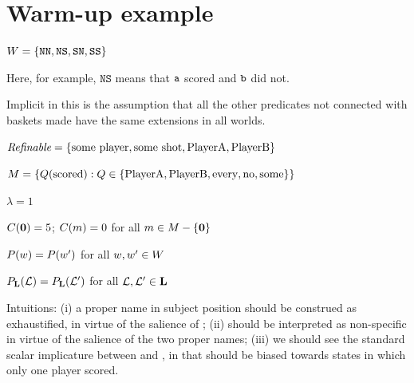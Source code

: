 \documentclass{article}
\begin{document}
\newpage

\section{Warm-up example}

\newcommand{\sNN}{\texttt{NN}}
\newcommand{\sNS}{\texttt{NS}}
\newcommand{\sNA}{\texttt{NA}}

\newcommand{\sSN}{\texttt{SN}}
\newcommand{\sSS}{\texttt{SS}}
\newcommand{\sSA}{\texttt{SA}}

\newcommand{\sAN}{\texttt{AN}}
\newcommand{\sAS}{\texttt{AS}}
\newcommand{\sAA}{\texttt{AA}}

\begin{examples}
\item

 \begin{examples}
  \item $\Worlds = \set{\sNN, \sNS, \sSN, \sSS}$

    Here, for example, $\sNS$ means that $\texttt{a}$ scored and
    $\texttt{b}$ did not.

    Implicit in this is the assumption that all the other predicates
    not connected with baskets made have the same extensions in all
    worlds.
    
  \item $\textit{Refinable} = \left\{ \text{some player}, \text{some shot}, \text{PlayerA}, \text{PlayerB} \right\}$
  \item $M = \left\{ Q(\text{scored}) : Q \in \left\{ \text{PlayerA}, \text{PlayerB}, \text{every}, \text{no}, \text{some} \right\} \right\}$
  \item $\lambda = 1$
  \item $C(\mathbf{0}) = 5$; $C(m) = 0$ for all $m \in M-\left\{ \mathbf{0} \right\}$  
  \item $P(w) = P(w')$ for all $w, w' \in W$
  \item $P_{\mathbf{L}}(\mathcal{L}) = P_{\mathbf{L}}(\mathcal{L}')$ for all $\mathcal{L}, \mathcal{L}' \in \mathbf{L}$
  \end{examples}

\item Intuitions: (i) a proper name in subject position should be
  construed as exhaustified, in virtue of the salience of
  ; (ii)  should be interpreted as non-specific
  in virtue of the salience of the two proper names; (iii) we should
  see the standard scalar implicature between  and
  , in that  should be biased towards states in
  which only one player scored.


\end{examples}
\end{document}
